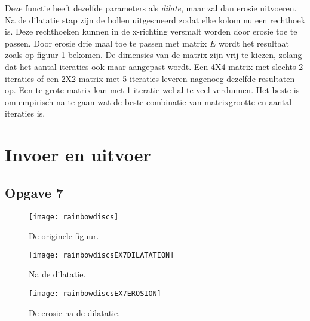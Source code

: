 \documentclass{article}
\begin{document}
\begin{itemize}
		 Deze functie heeft dezelfde parameters als \textit{dilate}, maar zal dan erosie uitvoeren. Na de dilatatie stap zijn de bollen uitgesmeerd zodat elke kolom nu een rechthoek is. Deze rechthoeken kunnen in de x-richting versmalt worden door erosie toe te passen. Door erosie drie maal toe te passen met matrix $E$ wordt het resultaat zoals op figuur \ref{Fig:ex2_3} bekomen. De dimensies van de matrix zijn vrij te kiezen, zolang dat het aantal iteraties ook maar aangepast wordt. Een 4X4 matrix met slechts 2 iteraties of een 2X2 matrix met 5 iteraties leveren nagenoeg dezelfde resultaten op. Een te grote matrix kan met 1 iteratie wel al te veel verdunnen. Het beste is om empirisch na te gaan wat de beste combinatie van matrixgrootte en aantal iteraties is.
		 

		 
		
		
	\end{itemize}
	\section{Invoer en uitvoer}

	\subsection*{Opgave 7}
	\begin{figure}[!htb]
		\begin{minipage}{0.3\textwidth}
			\centering
			\texttt{[image: rainbowdiscs]}
			\caption{De originele figuur.}
			\label{Fig:ex2_1}
		\end{minipage}\hfill
		\begin{minipage}{0.3\textwidth}
			\centering
			\texttt{[image: rainbowdiscsEX7DILATATION]}
			\caption{Na de dilatatie.}
			\label{Fig:ex2_2}
		\end{minipage}\hfill
		\begin{minipage}{0.3\textwidth}
			\centering
			\texttt{[image: rainbowdiscsEX7EROSION]}
			\caption{De erosie na de dilatatie.}
			\label{Fig:ex2_3}
		\end{minipage}
	\end{figure}

	
\end{document}
